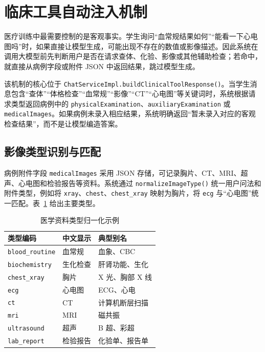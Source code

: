 \section{临床工具自动注入机制}

医疗训练中最需要控制的是客观事实。学生询问“血常规结果如何”“能看一下心电图吗”时，如果直接让模型生成，可能出现不存在的数值或影像描述。因此系统在调用大模型前先判断用户是否在请求查体、化验、影像或其他辅助检查；若命中，就直接从病例字段或附件 JSON 中返回结果，跳过模型生成。


该机制的核心位于 \texttt{ChatServiceImpl.buildClinicalToolResponse()}。当学生消息包含“查体”“体格检查”“血常规”“影像”“CT”“心电图”等关键词时，系统根据请求类型返回病例中的 \texttt{physicalExamination}、\texttt{auxiliaryExamination} 或 \texttt{medicalImages}。如果病例未录入相应结果，系统明确返回“暂未录入对应的客观检查结果”，而不是让模型编造答案。

\subsection{影像类型识别与匹配}

病例附件字段 \texttt{medicalImages} 采用 JSON 存储，可记录胸片、CT、MRI、超声、心电图和检验报告等资料。系统通过 \texttt{normalizeImageType()} 统一用户问法和附件类型，例如将 \texttt{xray}、\texttt{chest}、\texttt{chest\_xray} 映射为胸片，将 \texttt{ecg} 与“心电图”统一匹配。表~\ref{tab:image_type} 给出主要类型。

\begin{table}[H]
    \centering
    \caption{医学资料类型归一化示例}
    \label{tab:image_type}
    \begin{tabular}{lll}
        \toprule
        类型编码 & 中文显示 & 典型别名 \\
        \midrule
        \texttt{blood\_routine} & 血常规 & 血象、CBC \\
        \texttt{biochemistry} & 生化检查 & 肝肾功能、生化 \\
        \texttt{chest\_xray} & 胸片 & X 光、胸部 X 线 \\
        \texttt{ecg} & 心电图 & ECG、心电 \\
        \texttt{ct} & CT & 计算机断层扫描 \\
        \texttt{mri} & MRI & 磁共振 \\
        \texttt{ultrasound} & 超声 & B 超、彩超 \\
        \texttt{lab\_report} & 检验报告 & 化验单、报告单 \\
        \bottomrule
    \end{tabular}
\end{table}

